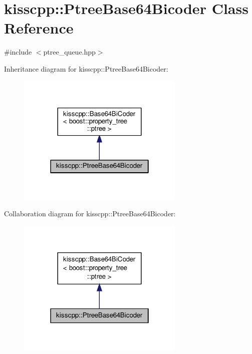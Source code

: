 \hypertarget{classkisscpp_1_1_ptree_base64_bicoder}{\section{kisscpp\-:\-:Ptree\-Base64\-Bicoder Class Reference}
\label{classkisscpp_1_1_ptree_base64_bicoder}
}


{\ttfamily \#include $<$ptree\-\_\-queue.\-hpp$>$}



Inheritance diagram for kisscpp\-:\-:Ptree\-Base64\-Bicoder\-:\nopagebreak
\begin{figure}[H]
\begin{center}
\leavevmode
\includegraphics[width=226pt]{classkisscpp_1_1_ptree_base64_bicoder__inherit__graph}
\end{center}
\end{figure}


Collaboration diagram for kisscpp\-:\-:Ptree\-Base64\-Bicoder\-:\nopagebreak
\begin{figure}[H]
\begin{center}
\leavevmode
\includegraphics[width=226pt]{classkisscpp_1_1_ptree_base64_bicoder__coll__graph}
\end{center}
\end{figure}
